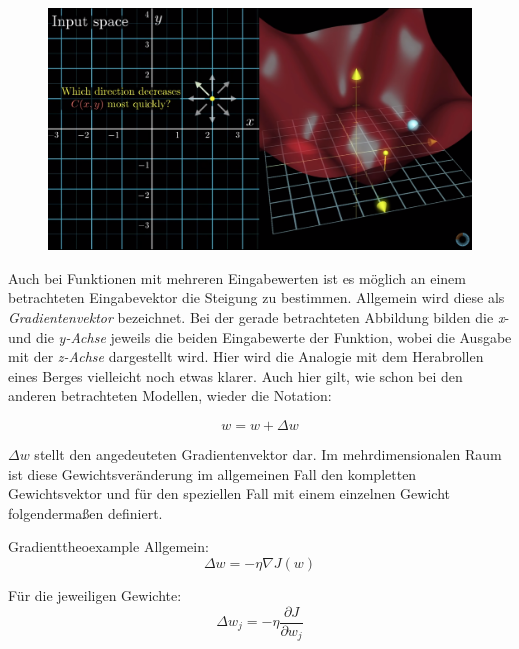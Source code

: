 \begin{figure}[!htb]
	\centering
	\includegraphics[width=\linewidth]{img/3dPlot_1}
	\label{fig:ad_gd3}
\end{figure}

Auch bei Funktionen mit mehreren Eingabewerten ist es möglich an einem betrachteten Eingabevektor die Steigung zu bestimmen. Allgemein wird diese als \emph{Gradientenvektor} bezeichnet. Bei der gerade betrachteten Abbildung bilden die \emph{x}- und die \emph{y-Achse} jeweils die beiden Eingabewerte der Funktion, wobei die Ausgabe mit der \emph{z-Achse} dargestellt wird. Hier wird die Analogie mit dem Herabrollen eines Berges vielleicht noch etwas klarer. Auch hier gilt, wie  schon bei den anderen betrachteten Modellen, wieder die Notation: 

\begin{equation} \label{eq:gewupd}
{w = w + \Delta w}
\end{equation}

${\Delta w}$ stellt den angedeuteten Gradientenvektor dar. Im mehrdimensionalen Raum ist diese Gewichtsveränderung im allgemeinen Fall den kompletten Gewichtsvektor und für den speziellen Fall mit einem einzelnen Gewicht folgendermaßen definiert. 

\vspace{3mm}
\begin{mytheo}{Gradient}{theoexample} \label{theo:gradient1}
Allgemein: 
\begin{equation}
{\Delta w = - \eta \nabla J(w)}
\end{equation}

Für die jeweiligen Gewichte: 
\begin{equation}
\Delta w_j = - \eta \frac{\partial J}{\partial w_j}
\end{equation}

\end{mytheo}

